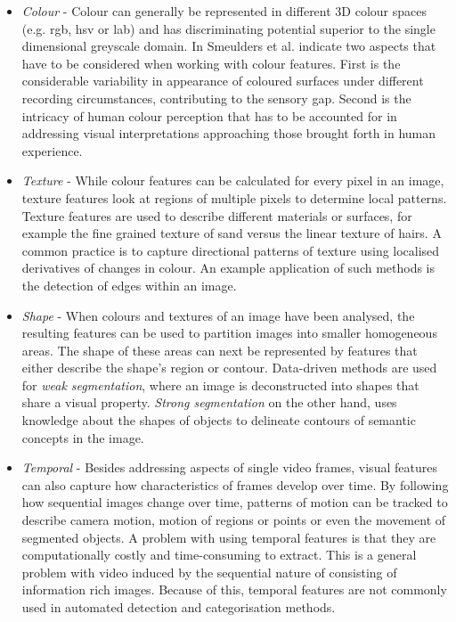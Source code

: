 \begin{itemize}
  \item \emph{Colour} - Colour can generally be represented in different 3D colour spaces (e.g. rgb, hsv or l\*a\*b) and has discriminating potential superior to the single dimensional greyscale domain. In \cite{Smeulders:2000tx} Smeulders et al. indicate two aspects that have to be considered when working with colour features. First is the considerable variability in appearance of coloured surfaces under different recording circumstances, contributing to the sensory gap. Second is the intricacy of human colour perception that has to be accounted for in addressing visual interpretations approaching those brought forth in human experience.
  \item \emph{Texture} - While colour features can be calculated for every pixel in an image, texture features look at regions of multiple pixels to determine local patterns. Texture features are used to describe different materials or surfaces, for example the fine grained texture of sand versus the linear texture of hairs. A common practice is to capture directional patterns of texture using localised derivatives of changes in colour\cite{Jain:1991wc}. An example application of such methods is the detection of edges within an image.

  \item \emph{Shape} - When colours and textures of an image have been analysed, the resulting features can be used to partition images into smaller homogeneous areas. The shape of these areas can next be represented by features that either describe the shape's region or contour. Data-driven methods are used for \emph{weak segmentation}, where an image is deconstructed into shapes that share a visual property\cite{Veltkamp:2001vn}.  \emph{Strong segmentation} on the other hand, uses knowledge about the shapes of objects to delineate contours of semantic concepts in the image.

  \item \emph{Temporal} - Besides addressing aspects of single video frames, visual features can also capture how characteristics of frames develop over time. By following how sequential images change over time, patterns of motion can be tracked to describe camera motion\cite{Tonomura:1994vb}, motion of regions or points \cite{Sivic:2006jw} or even the movement of segmented objects\cite{Nguyen:2000vk}. A problem with using temporal features is that they are computationally costly and time-consuming to extract. This is a general problem with video induced by the sequential nature of consisting of information rich images. Because of this, temporal features are not commonly used in automated detection and categorisation methods.

\end{itemize}

